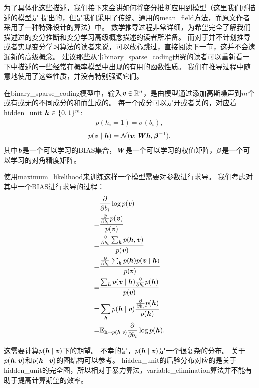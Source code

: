 为了具体化这些描述，我们接下来会讲如何将变分推断应用到模型（这里我们所描述的模型是 \citet{henniges2010binary} 提出的，但是我们采用了传统、通用的\gls{mean_field}方法，而原文作者采用了一种特殊设计的算法）中。
数学推导过程非常详细，为希望完全了解我们描述过的变分推断和变分学习高级概念描述的读者所准备。
而对于并不计划推导或者实现变分学习算法的读者来说，可以放心跳过，直接阅读下一节，这并不会遗漏新的高级概念。
建议那些从事\gls{binary_sparse_coding}研究的读者可以重新看一下中描述的一些经常在概率模型中出现的有用的函数性质。
我们在推导过程中随意地使用了这些性质，并没有特别强调它们。


在\gls{binary_sparse_coding}模型中，输入$\Vv\in\SetR^n$，是由模型通过添加高斯噪声到$m$个或有或无的不同成分的和而生成的。
每一个成分可以是开或者关的，对应着\gls{hidden_unit} $\Vh \in\{0,1\}^m$:
\begin{align}
	p(h_i = 1) = \sigma(b_i),
\end{align}
\begin{align}
	p(\Vv\mid\Vh) = \CalN(\Vv;\MW \Vh,{\Vbeta}^{-1}),
\end{align}
其中$\Vb$是一个可以学习的\gls{BIAS}集合，$\MW$是一个可以学习的权值矩阵，${\Vbeta}$是一个可以学习的对角精度矩阵。


使用\gls{maximum_likelihood}来训练这样一个模型需要对参数进行求导。
我们考虑对其中一个\gls{BIAS}进行求导的过程：
\begin{align}
		& \frac{\partial}{\partial b_i} \log p(\Vv) \\
		= &  \frac{\frac{\partial}{\partial b_i} p(\Vv)}{p(\Vv)}\\
		= & \frac{\frac{\partial}{\partial b_i} \sum_{\Vh}^{} p(\Vh,\Vv)}{p(\Vv)}\\
		= &  \frac{\frac{\partial}{\partial b_i} \sum_{\Vh}^{} p(\Vh) p(\Vv\mid \Vh)  }{p(\Vv)}\\
		= &  \frac{ \sum_{\Vh}^{}  p(\Vv\mid \Vh) \frac{\partial}{\partial b_i} p(\Vh) }{p(\Vv)}\\
		= &  \sum_{\Vh}^{}  p(\Vh\mid \Vv) \frac{  \frac{\partial}{\partial b_i} p(\Vh) }{p(\Vh)}\\
		= & \SetE_{\RVh\sim p(\Vh\mid\Vv)} \frac{\partial}{\partial b_i}\log p(\Vh).
\end{align}


这需要计算$p(\Vh\mid\Vv)$下的期望。
不幸的是，$p(\Vh\mid\Vv)$是一个很复杂的分布。
关于$p(\Vh,\Vv)$和$p(\Vh\mid\Vv)$的图结构可以参考。
\gls{hidden_unit}的后验分布对应的是关于\gls{hidden_unit}的完全图，所以相对于暴力算法，\gls{variable_elimination}算法并不能有助于提高计算期望的效率。


